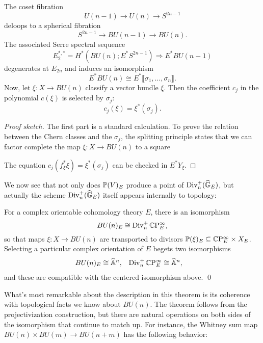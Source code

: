 \begin{theorem}
The coset fibration \[U(n-1) \to U(n) \to S^{2n-1}\] deloops to a spherical fibration \[S^{2n-1} \to BU(n-1) \to BU(n).\]  The associated Serre spectral sequence \[E_2^{*, *} = H^*(BU(n); E^* S^{2n-1}) \Rightarrow E^* BU(n-1)\] degenerates at $E_{2n}$ and induces an isomorphism \[E^* BU(n) \cong E^* \llbracket \sigma_1, \ldots, \sigma_n\rrbracket.\]  Now, let $\xi: X \to BU(n)$ classify a vector bundle $\xi$.  Then the coefficient $c_j$ in the polynomial $c(\xi)$ is selected by $\sigma_j$: \[c_j(\xi) = \xi^*(\sigma_j).\]
\end{theorem}
\begin{proof}[Proof sketch]
The first part is a standard calculation.  To prove the relation between the Chern classes and the $\sigma_j$, the splitting principle states that we can factor complete the map $\xi: X \to BU(n)$ to a square
\begin{center}
\end{center}
The equation $c_j(f_\xi^* \xi) = \xi^*(\sigma_j)$ can be checked in $E^* Y_\xi$.
\end{proof}

We now see that not only does $\P(V)_E$ produce a point of $\Div_n^+(\G_E)$, but actually the scheme $\Div_n^+(\G_E)$ itself appears internally to topology:

\begin{corollary}
For a complex orientable cohomology theory $E$, there is an isomorphism \[BU(n)_E \cong \Div_n^+ \CP^\infty_E,\] so that maps $\xi: X \to BU(n)$ are transported to divisors $\P(\xi)_E \subseteq \CP^\infty_E \times X_E$.  Selecting a particular complex orientation of $E$ begets two isomorphisms
\begin{align*}
BU(n)_E & \cong \A^n, &
\Div_n^+ \CP^\infty_E & \cong \A^n,
\end{align*}
and these are compatible with the centered isomorphism above. \qed
\end{corollary}

What's most remarkable about the description in this theorem is its coherence with topological facts we know about $BU(n)$.  The theorem follows from the projectivization construction, but there are natural operations on both sides of the isomorphism that continue to match up.  For instance, the Whitney sum map $BU(n) \times BU(m) \to BU(n+m)$ has the following behavior:

